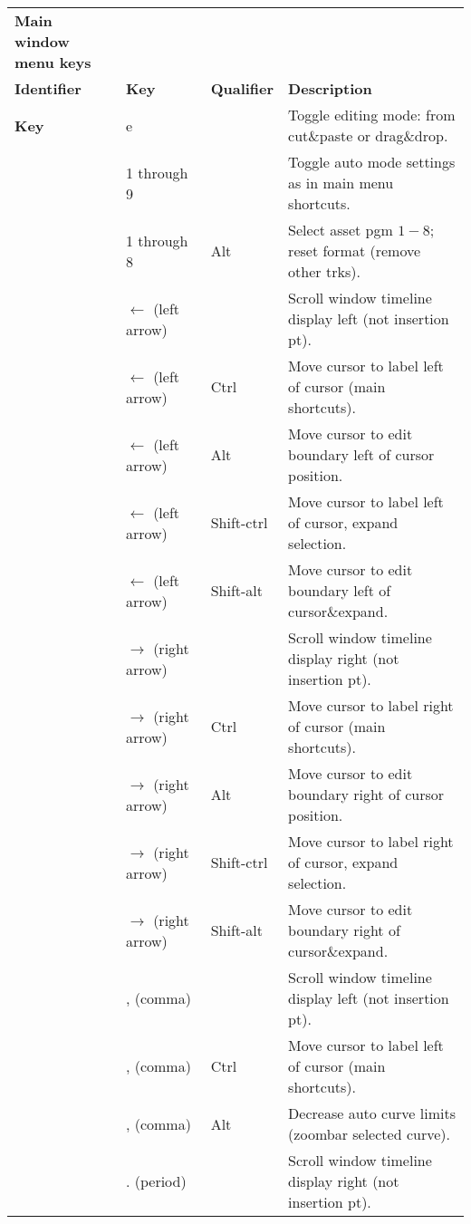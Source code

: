 \begin{longtable}[h]{>{\bfseries}p{}p{}p{}p{}}
  \toprule
  \multicolumn{4}{c}%
  {\textcolor{CinRed}{\textbf{Main window menu keys}}} \\
  Identifier & \textbf{Key} & \textbf{Qualifier} & \textbf{Description}\\
  \midrule
  \endhead
  \textcolor{CinBlueText}{Key} & e & & Toggle editing mode: from cut\&paste or drag\&drop. \\
  & 1 through 9 &  & Toggle auto mode settings as in main menu shortcuts. \\
  & 1 through 8 & Alt & Select asset pgm $1-8$; reset format (remove other trks). \\
  & $\leftarrow$ (left arrow) &  & Scroll window timeline display left (not insertion pt). \\
  & $\leftarrow$ (left arrow) & Ctrl & Move cursor to label left of cursor (main shortcuts). \\
  & $\leftarrow$ (left arrow) & Alt & Move cursor to edit boundary left of cursor position. \\
  & $\leftarrow$ (left arrow) & Shift-ctrl & Move cursor to label left of cursor, expand selection. \\
  & $\leftarrow$ (left arrow) & Shift-alt & Move cursor to edit boundary left of cursor\&expand. \\
  & $\rightarrow$ (right arrow) &  & Scroll window timeline display right (not insertion pt). \\
  & $\rightarrow$ (right arrow) & Ctrl & Move cursor to label right of cursor (main shortcuts). \\
  & $\rightarrow$ (right arrow) & Alt & Move cursor to edit boundary right of cursor position. \\
  & $\rightarrow$ (right arrow) & Shift-ctrl & Move cursor to label right of cursor, expand selection. \\
  & $\rightarrow$ (right arrow) & Shift-alt & Move cursor to edit boundary right of cursor\&expand. \\
  & , (comma) &  & Scroll window timeline display left (not insertion pt). \\
  & , (comma) & Ctrl & Move cursor to label left of cursor (main shortcuts). \\
  & , (comma) & Alt & Decrease auto curve limits (zoombar selected curve). \\
  & . (period) &  & Scroll window timeline display right (not insertion pt). \\

\end{longtable}
